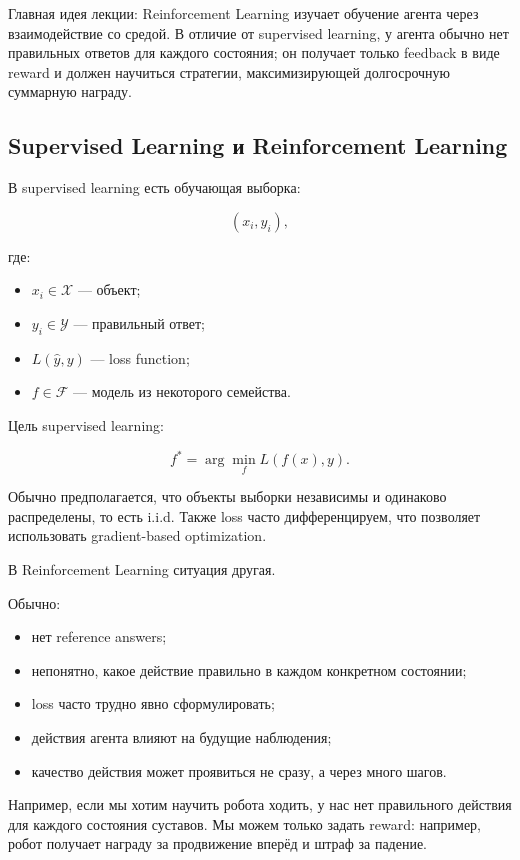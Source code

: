 \documentclass[a4paper,12pt]{article}
\begin{document}
Главная идея лекции: Reinforcement Learning изучает обучение агента через взаимодействие со средой. В отличие от supervised learning, у агента обычно нет правильных ответов для каждого состояния; он получает только feedback в виде reward и должен научиться стратегии, максимизирующей долгосрочную суммарную награду.

\subsection{Supervised Learning и Reinforcement Learning}

В supervised learning есть обучающая выборка:

\[
(x_i, y_i),
\]

где:

\begin{itemize}
    \item \(x_i \in \mathcal{X}\) --- объект;
    \item \(y_i \in \mathcal{Y}\) --- правильный ответ;
    \item \(L(\hat{y}, y)\) --- loss function;
    \item \(f \in \mathcal{F}\) --- модель из некоторого семейства.
\end{itemize}

Цель supervised learning:

\[
f^*
=
\arg\min_f
L(f(x), y).
\]

Обычно предполагается, что объекты выборки независимы и одинаково распределены, то есть i.i.d. Также loss часто дифференцируем, что позволяет использовать gradient-based optimization.

В Reinforcement Learning ситуация другая.

Обычно:

\begin{itemize}
    \item нет reference answers;
    \item непонятно, какое действие правильно в каждом конкретном состоянии;
    \item loss часто трудно явно сформулировать;
    \item действия агента влияют на будущие наблюдения;
    \item качество действия может проявиться не сразу, а через много шагов.
\end{itemize}

Например, если мы хотим научить робота ходить, у нас нет правильного действия для каждого состояния суставов. Мы можем только задать reward: например, робот получает награду за продвижение вперёд и штраф за падение.
\end{document}
